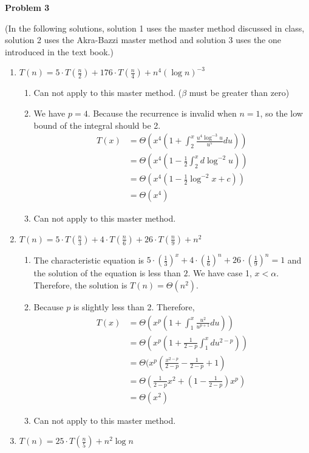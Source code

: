 \documentclass[12pt,letterpaper]{article}
\def\pp{\par\noindent}
\newcommand{\problem}[1]{ \bigskip \pp \textbf{Problem #1}\par}
\begin{document}
\problem{3}
(In the following solutions, solution 1 uses the master method discussed in class, solution 2 uses the Akra-Bazzi master method and solution 3 uses the one introduced in the text book.) 
\begin{enumerate}[label=(\alph*)]
	\item$T(n)=5\cdot T(\frac{n}{2})+176\cdot T(\frac{n}{4})+n^4(\log n)^{-3}$
		\begin{enumerate}[label=\arabic*.]
			\item Can not apply to this master method. ($\beta$ must be greater than zero)
			\item We have $p=4$. Because the recurrence is invalid when $n=1$, so the low bound of the integral should be 2.
				\begin{align*}
					T(x)&=\Theta(x^4(1+\int_2^x\frac{u^4\log^{-3}u}{u^5}du))\\
					&=\Theta(x^4(1-\frac{1}{2}\int_2^xd\log^{-2}u))\\
					&=\Theta(x^4(1-\frac{1}{2}\log^{-2}x+c))\\
					&=\Theta(x^4)
				\end{align*}
			\item Can not apply to this master method.
		\end{enumerate}
	\item$T(n)=5\cdot T(\frac{n}{3})+4\cdot T(\frac{n}{6})+26\cdot T(\frac{n}{9})+n^2$
		\begin{enumerate}[label=\arabic*.]
			\item The characteristic equation is $5\cdot(\frac{1}{3})^x+4\cdot(\frac{1}{6})^n+26\cdot(\frac{1}{9})^n=1$ and the solution of the equation is less than $2$. We have case 1, $x<\alpha$. Therefore, the solution is $T(n)=\Theta(n^2)$.
			\item Because $p$ is slightly less than 2. Therefore,
				\begin{align*}
					T(x)&=\Theta(x^p(1+\int_1^x\frac{u^2}{u^{p+1}}du))\\
					&=\Theta(x^p(1+\frac{1}{2-p}\int_1^xdu^{2-p}))\\
					&=\Theta(x^p(\frac{x^{2-p}}{2-p}-\frac{1}{2-p}+1)\\
					&=\Theta(\frac{1}{2-p}x^2+(1-\frac{1}{2-p})x^p)\\
					&=\Theta(x^2)
				\end{align*}
			\item Can not apply to this master method.
		\end{enumerate}
	\item$T(n)=25\cdot T(\frac{n}{5})+n^2\log n$

\end{enumerate}
\end{document}
